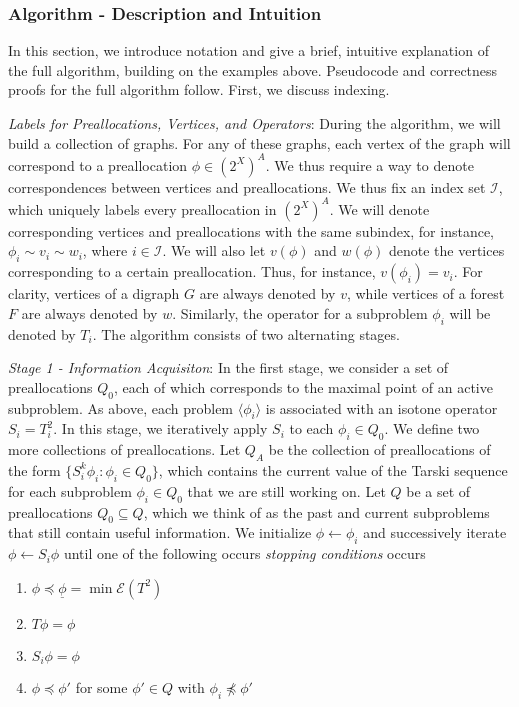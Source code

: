 \documentclass[11pt,reqno]{amsart}
\theoremstyle{definition}
\numberwithin{equation}{section}
\newcommand{\ul}{\underline}
\newcommand{\lag}{\langle}
\newcommand{\rag}{\rangle}
\newcommand{\pre}{\phi}
\newcommand{\prealloc}{(2^X)^A}
\newcommand{\sub}{\subseteq}
\newcommand{\fix}{\mathcal{E}}
\newcommand{\peq}{\preceq}
\newcommand{\acto}{Q_0}
\newcommand{\acta}{Q_A}
\begin{document}
\subsubsection{Algorithm - Description and Intuition} 

In this section, we introduce notation and give a brief, intuitive explanation of the full algorithm, building on the examples above.
Pseudocode and correctness proofs for the full algorithm follow. 
First, we discuss indexing. 

\emph{Labels for Preallocations, Vertices, and Operators}:
During the algorithm, we will build a collection of graphs.
For any of these graphs, each vertex of the graph will correspond to a preallocation $\pre \in \prealloc$.
We thus require a way to denote correspondences between vertices and preallocations. 
We thus fix an index set $\mathcal{I}$, which uniquely labels every preallocation in $\prealloc$. 
We will denote corresponding vertices and preallocations with the same subindex, for instance, $\pre_i \sim v_i \sim w_i$, where $i \in \mathcal{I}$. 
We will also let $v(\pre)$ and $w(\pre)$ denote the vertices corresponding to a certain preallocation. 
Thus, for instance, $v(\pre_i) = v_i$.
For clarity, vertices of a digraph $G$ are always denoted by $v$, while vertices of a forest $F$ are always denoted by $w$.
Similarly, the operator for a subproblem $\pre_i$ will be denoted by $T_i$.
The algorithm consists of two alternating stages. 

\emph{Stage 1 - Information Acquisiton}: In the first stage, we consider a set of preallocations $\acto$, each of which corresponds to the maximal point of an active subproblem. 
As above, each problem $\lag \pre_i \rag$ is associated with an isotone operator $S_i = T_i^2$.
In this stage, we iteratively apply $S_i$ to each $\pre_i \in \acto$.
We define two more collections of preallocations.
Let $\acta$ be the collection of preallocations of the form $\{S_i^k \pre_i: \pre_i \in \acto\}$, which contains the current value of the Tarski sequence for each subproblem $\pre_i \in \acto$ that we are still working on.
Let $Q$ be a set of preallocations $\acto \sub Q$, which we think of as the past and current subproblems that still contain useful information.  
We initialize $\pre \leftarrow \pre_i$ and successively iterate $\pre \leftarrow S_i \pre$ until one of the following occurs \emph{stopping conditions} occurs
\begin{enumerate}
\item $\pre \peq \ul{\pre} = \min \fix(T^2)$ 
\item $T \pre = \pre$
\item $S_i \pre = \pre$
\item $\pre \peq \pre'$ for some $\pre' \in Q$ with $\pre_i \not \peq \pre'$ 
\end{enumerate} 
\end{document}
